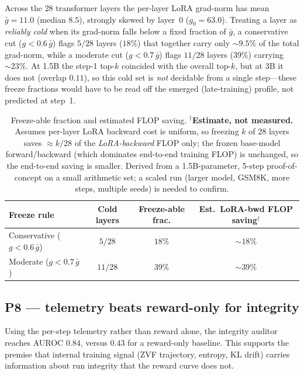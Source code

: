 \documentclass[12pt,a4paper]{report}
\begin{document}
Across the $28$ transformer layers the per-layer LoRA grad-norm has mean
$\bar{g}=11.0$ (median $8.5$), strongly skewed by layer~0 ($g_0=63.0$). Treating a
layer as \emph{reliably cold} when its grad-norm falls below a fixed fraction of
$\bar{g}$, a conservative cut ($g<0.6\,\bar{g}$) flags $5/28$ layers ($18\%$) that
together carry only $\sim\!9.5\%$ of the total grad-norm, while a moderate cut
($g<0.7\,\bar{g}$) flags $11/28$ layers ($39\%$) carrying $\sim\!23\%$. At 1.5B the step-1 top-$k$ coincided with the overall top-$k$, but at 3B it does
not (overlap $0.11$), so this cold set is \emph{not} decidable from a single step---these
freeze fractions would have to be read off the emerged (late-training) profile, not
predicted at step~1.

\begin{table}[h]
\centering
\small
\begin{tabular}{lccc}
\toprule
Freeze rule & Cold layers & Freeze-able frac. & Est.\ LoRA-bwd FLOP saving$^{\dagger}$ \\
\midrule
Conservative ($g<0.6\,\bar{g}$) & $5/28$  & $18\%$ & $\sim\!18\%$ \\
Moderate ($g<0.7\,\bar{g}$)     & $11/28$ & $39\%$ & $\sim\!39\%$ \\
\bottomrule
\end{tabular}
\caption{Freeze-able fraction and estimated FLOP saving. $^{\dagger}$\textbf{Estimate,
not measured.} Assumes per-layer LoRA backward cost is uniform, so freezing $k$ of
$28$ layers saves $\approx k/28$ of the \emph{LoRA-backward} FLOP only; the frozen
base-model forward/backward (which dominates end-to-end training FLOP) is unchanged,
so the end-to-end saving is smaller. Derived from a 1.5B-parameter, 5-step
proof-of-concept on a small arithmetic set; a scaled run (larger model, GSM8K, more
steps, multiple seeds) is needed to confirm.}
\label{tab:p1-freeze-estimate}
\end{table}

\subsection{P8 --- telemetry beats reward-only for integrity}
Using the per-step telemetry rather than reward alone, the integrity auditor
reaches AUROC $0.84$, versus $0.43$ for a reward-only baseline. This supports the
premise that internal training signal (ZVF trajectory, entropy, KL drift) carries
information about run integrity that the reward curve does not.
\end{document}
